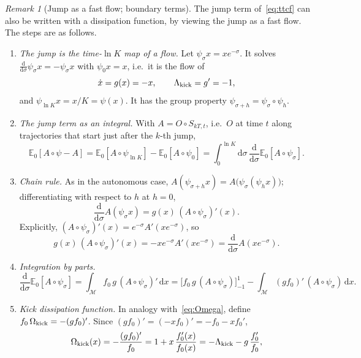 \documentclass[11pt,a4paper]{article}
\theoremstyle{remark}
\newtheorem{remark}{Remark}
\newcommand{\E}{\mathbb{E}}
\newcommand{\M}{\mathcal{M}}
\newcommand{\dd}{\mathrm{d}}
\begin{document}
\begin{remark}[Jump as a fast flow; boundary terms]\label{rem:kick}
The jump term of~\eqref{eq:ttcf} can also be written with a dissipation
function, by viewing the jump as a fast flow. The steps are as follows.
\begin{enumerate}
\item \emph{The jump is the time-$\ln K$ map of a flow.} Let
  $\psi_\sigma x = xe^{-\sigma}$. It solves $\frac{\dd}{\dd\sigma}\psi_\sigma
  x=-\psi_\sigma x$ with $\psi_0 x=x$, i.e.\ it is the flow of
  \begin{equation}
    \dot x = g(x) = -x,\qquad \Lambda_{\rm kick}=g'=-1,
  \end{equation}
  and $\psi_{\ln K}x = x/K = \psi(x)$. It has the group property
  $\psi_{\sigma+h}=\psi_\sigma\circ\psi_h$.
\item \emph{The jump term as an integral.} With $A=O\circ S_{kT,t}$, i.e.\ $O$ at
  time $t$ along trajectories that start just after the $k$-th jump,
  \begin{equation}
    \E_0[A\circ\psi - A]
    = \E_0[A\circ\psi_{\ln K}]-\E_0[A\circ\psi_0]
    = \int_0^{\ln K}\dd\sigma\,\frac{\dd}{\dd\sigma}\E_0[A\circ\psi_\sigma].
  \end{equation}
\item \emph{Chain rule.} As in the autonomous case,
  $A(\psi_{\sigma+h}x)=A\big(\psi_\sigma(\psi_hx)\big)$; differentiating with
  respect to $h$ at $h=0$,
  \begin{equation}
    \frac{\dd}{\dd\sigma}A(\psi_\sigma x) = g(x)\,(A\circ\psi_\sigma)'(x).
  \end{equation}
  Explicitly, $(A\circ\psi_\sigma)'(x)=e^{-\sigma}A'(xe^{-\sigma})$, so
  \[
    g(x)\,(A\circ\psi_\sigma)'(x)=-xe^{-\sigma}A'(xe^{-\sigma})
    =\frac{\dd}{\dd\sigma}A(xe^{-\sigma}).
  \]
\item \emph{Integration by parts.}
  \begin{equation}
    \frac{\dd}{\dd\sigma}\E_0[A\circ\psi_\sigma]
    = \int_\M f_0\,g\,(A\circ\psi_\sigma)'\,\dd x
    = \Big[f_0\,g\,(A\circ\psi_\sigma)\Big]_{-1}^{1}
      - \int_\M (gf_0)'\,(A\circ\psi_\sigma)\,\dd x .
  \end{equation}
\item \emph{Kick dissipation function.} In analogy with~\eqref{eq:Omega},
  define $f_0\,\Omega_{\rm kick}=-(gf_0)'$. Since $(gf_0)'=(-xf_0)'=-f_0-xf_0'$,
  \begin{equation}
    \Omega_{\rm kick}(x) = -\frac{(gf_0)'}{f_0} = 1+x\,\frac{f_0'(x)}{f_0(x)}
    = -\Lambda_{\rm kick} - g\,\frac{f_0'}{f_0},

\end{equation}
\end{enumerate}
\end{remark}
\end{document}
